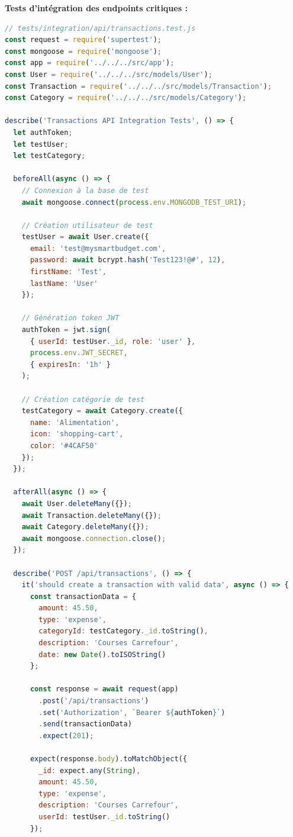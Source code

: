 \begin{exemple}
\textbf{Tests d'intégration des endpoints critiques :}
\begin{lstlisting}[language=JavaScript]
// tests/integration/api/transactions.test.js
const request = require('supertest');
const mongoose = require('mongoose');
const app = require('../../../src/app');
const User = require('../../../src/models/User');
const Transaction = require('../../../src/models/Transaction');
const Category = require('../../../src/models/Category');

describe('Transactions API Integration Tests', () => {
  let authToken;
  let testUser;
  let testCategory;

  beforeAll(async () => {
    // Connexion à la base de test
    await mongoose.connect(process.env.MONGODB_TEST_URI);
    
    // Création utilisateur de test
    testUser = await User.create({
      email: 'test@mysmartbudget.com',
      password: await bcrypt.hash('Test123!@#', 12),
      firstName: 'Test',
      lastName: 'User'
    });
    
    // Génération token JWT
    authToken = jwt.sign(
      { userId: testUser._id, role: 'user' },
      process.env.JWT_SECRET,
      { expiresIn: '1h' }
    );
    
    // Création catégorie de test
    testCategory = await Category.create({
      name: 'Alimentation',
      icon: 'shopping-cart',
      color: '#4CAF50'
    });
  });

  afterAll(async () => {
    await User.deleteMany({});
    await Transaction.deleteMany({});
    await Category.deleteMany({});
    await mongoose.connection.close();
  });

  describe('POST /api/transactions', () => {
    it('should create a transaction with valid data', async () => {
      const transactionData = {
        amount: 45.50,
        type: 'expense',
        categoryId: testCategory._id.toString(),
        description: 'Courses Carrefour',
        date: new Date().toISOString()
      };

      const response = await request(app)
        .post('/api/transactions')
        .set('Authorization', `Bearer ${authToken}`)
        .send(transactionData)
        .expect(201);

      expect(response.body).toMatchObject({
        _id: expect.any(String),
        amount: 45.50,
        type: 'expense',
        description: 'Courses Carrefour',
        userId: testUser._id.toString()
      });


\end{lstlisting}
\end{exemple}
